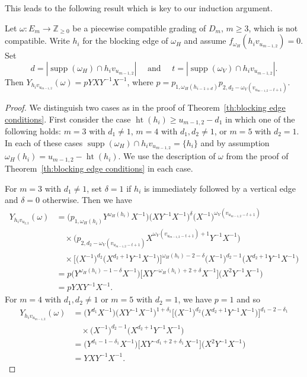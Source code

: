 \documentclass[ALCO,ThmDefs,Unicode,epreuves]{cedram}
\newcommand{\ZZ}{\mathbb{Z}}
\DeclareMathOperator{\hgt}{ht}
\DeclareMathOperator{\supp}{supp}
\begin{document}
This leads to the following result which is key to our induction argument.
\begin{corollary}
 \label{cor:incompatible collapse}
 Let $\omega:E_m\to\ZZ_{\ge0}$ be a piecewise compatible grading of $D_m$, $m\ge3$, which is not compatible. 
 Write $h_i$ for the blocking edge of $\omega_H$ and assume $f_{\omega_H}(h_iv_{u_{m-1,2}})=0$. 
 Set 
 \[d=|\supp(\omega_H)\cap h_iv_{u_{m-1,2}}|\quad\text{ and }\quad t=|\supp(\omega_V)\cap h_iv_{u_{m-1,2}}|.\]
 Then $Y_{h_iv_{u_{m-1,2}}}(\omega)=pYXY^{-1}X^{-1}$, where $p=p_{1,\omega_H(h_{i-1+d})}p_{2,d_2-\omega_V(v_{u_{m-1,2}-t+1})}$.
\end{corollary}
\begin{proof}
 We distinguish two cases as in the proof of Theorem~\ref{th:blocking edge conditions}.
 First consider the case $\hgt(h_i)\ge u_{m-1,2}-d_1$ in which one of the following holds: $m=3$ with $d_1\ne1$, $m=4$ with $d_1,d_2\ne1$, or $m=5$ with $d_2=1$.
 In each of these cases $\supp(\omega_H)\cap h_iv_{u_{m-1,2}}=\{h_i\}$ and by assumption $\omega_H(h_i)=u_{m-1,2}-\hgt(h_i)$.
 We use the description of $\omega$ from the proof of Theorem~\ref{th:blocking edge conditions} in each case.

 For $m=3$ with $d_1\ne1$, set $\delta=1$ if $h_i$ is immediately followed by a vertical edge and $\delta=0$ otherwise. 
 Then we have
 \begin{align*}
 Y_{h_iv_{u_{2,2}}}(\omega)
 &=\big(p_{1,\omega_H(h_i)}Y^{\omega_H(h_i)} X^{-1}\big)\big(XY^{-1}X^{-1}\big)^\delta\big(X^{-1}\big)^{\omega_V(v_{u_{m-1,2}-t+1})}\\
 &\quad\times\big(p_{2,d_2-\omega_V(v_{u_{m-1,2}-t+1})}X^{\omega_V(v_{u_{m-1,2}-t+1})+1}Y^{-1}X^{-1}\big)\\
 &\quad\times\Big[\big(X^{-1}\big)^{d_2}\big(X^{d_2+1}Y^{-1}X^{-1}\big)\Big]^{\omega_H(h_i)-2-\delta}\big(X^{-1}\big)^{d_2-1}\big(X^{d_2+1}Y^{-1}X^{-1}\big)\\
 &=p\big(Y^{\omega_H(h_i)-1-\delta}X^{-1}\big)\Big[XY^{-\omega_H(h_i)+2+\delta}X^{-1}\Big]\big(X^2Y^{-1}X^{-1}\big)\\
 &=pYXY^{-1}X^{-1}.
 \end{align*}
 For $m=4$ with $d_1,d_2\ne1$ or $m=5$ with $d_2=1$, we have $p=1$ and so
 \begin{align*}
 Y_{h_iv_{u_{m-1,2}}}(\omega)
 &=\big(Y^{d_1}X^{-1}\big)\big(XY^{-1}X^{-1}\big)^{1+\delta_1}\Big[\big(X^{-1}\big)^{d_2}\big(X^{d_2+1}Y^{-1}X^{-1}\big)\Big]^{d_1-2-\delta_1}\\
 &\quad\times\big(X^{-1}\big)^{d_2-1}\big(X^{d_2+1}Y^{-1}X^{-1}\big)\\
 &=\big(Y^{d_1-1-\delta_1}X^{-1}\big)\Big[XY^{-d_1+2+\delta_1}X^{-1}\Big]\big(X^2Y^{-1}X^{-1}\big)\\
 &=YXY^{-1}X^{-1}.
 \end{align*}


\end{proof}
\end{document}
